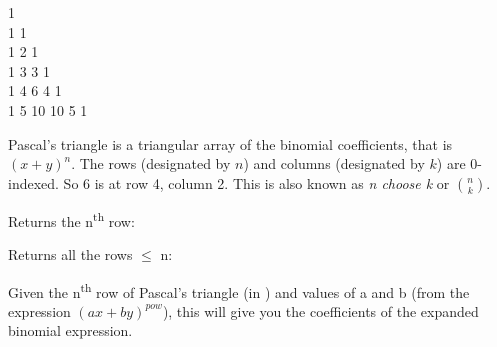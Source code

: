 
\begin{center}
1 \\
1 1 \\
1 2 1 \\
1 3 3 1 \\
1 4 6 4 1 \\
1 5 10 10 5 1
\end{center}

Pascal’s triangle is a triangular array of the binomial coefficients, that is $(x + y)^n$. The rows (designated by $n$) and columns (designated by $k$) are 0-indexed. So 6 is at row 4, column 2. This is also known as \textit{n choose k} or $\binom{n}{k}$.

Returns the n\textsuperscript{th} row:



Returns all the rows $\leq$ n:



Given the n\textsuperscript{th} row of Pascal's triangle (in ) and values of a and b (from the expression $(ax + by)^{pow}$), this will give you the coefficients of the expanded binomial expression.



\newpage